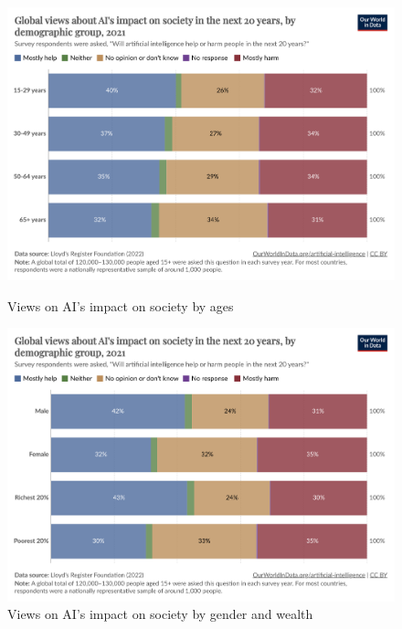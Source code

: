 \documentclass[paper=a4, fontsize=11pt]{scrartcl} %
\numberwithin{equation}{section} %
\numberwithin{figure}{section} %
\numberwithin{table}{section} %
\begin{document}
\begin{figure}[H]
    \centering
    \begin{minipage}[t]{0.48\linewidth}
        \includegraphics[width=\linewidth]{./data/influence_by_ages.png}
        \caption{Views on AI's impact on society by ages}
        \label{fig:investment}
    \end{minipage}\hfill
    \begin{minipage}[t]{0.48\linewidth}
        \includegraphics[width=\linewidth]{./data/influence_by_demographic_group.png}
        \caption{Views on AI's impact on society by gender and wealth}
        \label{fig:views_ai_impact}
    \end{minipage}
\end{figure}


\end{document}
